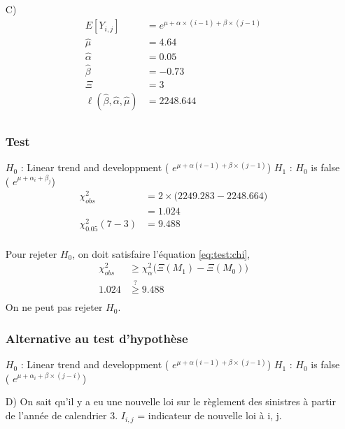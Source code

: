 \documentclass[11pt,french]{report}
\begin{document}
\begin{itemize}
\item[C)]
\begin{align*}
E[Y_{i,j}] &= e^{\mu + \alpha\times(i-1) + \beta \times (j-1)} \\
\widehat{\mu} &= 4.64 \\
\widehat{\alpha} &= 0.05 \\
\widehat{\beta} &= -0.73 \\
\Xi &= 3 \\
\ell(\widehat{\beta}, \widehat{\alpha}, \widehat{\mu}) & = 2248.644 \\
\end{align*} 
\subsubsection*{Test}
$H_0$ : Linear trend and developpment ( $e^{\mu + \alpha(i-1) + \beta \times (j-1)}$) \newline
$H_1$ : $H_0$ is false ( $e^{\mu + \alpha_i + \beta_j}$)
\begin{align*}
\chi_{obs}^2 &= 2 \times \Big( 2249.283 - 2248.664 \Big) \\
&= 1.024 \\
\chi_{0.05}^2(7 - 3) &= 9.488 \\
\end{align*}

Pour rejeter $H_0$, on doit satisfaire l'équation \ref{eq:test:chi},
\begin{align*}
\chi_{obs}^2 &\geq \chi_{\alpha}^2\Big( \Xi (M_1) - \Xi (M_0) \Big) \\
1.024 &\overset{?}{\geq} 9.488\\
\end{align*}
On ne peut pas rejeter $H_0$.
\bigskip

\subsubsection*{Alternative au test d'hypothèse}
$H_0$ : Linear trend and developpment ( $e^{\mu + \alpha(i-1) + \beta \times (j-1)}$) \newline
$H_1$ : $H_0$ is false ( $e^{\mu + \alpha_i + \beta \times (j-i)}$)

\bigskip
\item[D)]
On sait qu'il y a eu une nouvelle loi sur le règlement des sinistres à partir de l'année de calendrier 3. $I_{i,j}$ = indicateur de nouvelle loi à i, j.


\end{itemize}
\end{document}

